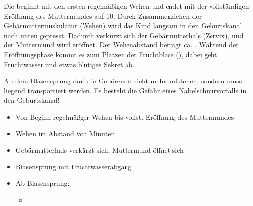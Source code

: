 {%
Die  beginnt mit den ersten regelmäßigen
Wehen und endet mit der vollständigen Eröffnung des
Muttermundes auf 10\CM*.
\cite{StriebelAnaesthesie2,BuehlingGynaekologie1,HaagGyn2007}
Durch Zusammenziehen der Gebärmuttermuskulatur
(Wehen) wird das Kind langsam in den Geburtskanal nach unten
gepresst. Dadurch verkürzt sich der Gebärmutterhals
(Zervix), und der Muttermund wird eröffnet. Der
Wehenabstand beträgt ca. \Min*.
%
Während der Eröffnungsphase
kommt es zum Platzen der Fruchtblase (),
dabei geht Fruchtwasser und etwas blutiges Sekret ab.


\begin{Danger}
  \item Ab dem Blasensprung darf die Gebärende nicht mehr aufstehen,
  sondern muss liegend transportiert werden. Es besteht die
  Gefahr eines Nabelschnurvorfalls in den Geburtskanal!
\end{Danger}
}{%
\begin{itemize}
  \item Von Beginn regelmäßger Wehen bis vollst. Eröffnung
  des Muttermundes
  \item Wehen im Abstand von  Minuten
  \item Gebärmutterhals verkürzt sich, Muttermund öffnet sich
  \item Blasensprung mit Fruchtwasserabgang
  \item Ab Blasensprung: 
  \begin{itemize}
    \item {}
  \end{itemize}
\end{itemize}
}{}{}{}

